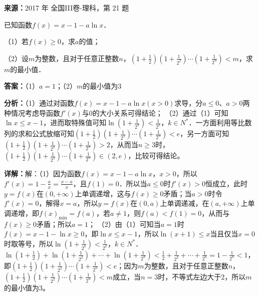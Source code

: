 \begin{question}[points=12]
\textbf{来源：}2017 年 全国III卷-理科，第 21 题\par
已知函数$f(x)=x-1-a\ln x$．

（1）若$f(x)\ge 0$，求$a$的值；

（2）设$m$为整数，且对于任意正整数$n$，$(1+\frac{1}{2})(1+\frac{1}{2^2})\cdots(1+\frac{1}{2^n})<m$，求$m$的最小值．
\begin{solution}
\textbf{答案：}（1）$a=1$；（2）$m$的最小值为$3$

\textbf{分析：}（1）通过对函数$f(x)=x-1-a\ln x(x>0)$求导，分$a\le 0$、$a>0$两种情况考虑导函数$f'(x)$与$0$的大小关系可得结论；
（2）通过（1）可知$\ln x\le x-1$，进而取特殊值可知$\ln(1+\frac{1}{2^k})<\frac{1}{2^k}$，$k\in N^*$．一方面利用等比数列的求和公式放缩可知$(1+\frac{1}{2})(1+\frac{1}{2^2})\cdots(1+\frac{1}{2^n})<e$，另一方面可知$(1+\frac{1}{2})(1+\frac{1}{2^2})\cdots(1+\frac{1}{2^n})>2$，从而当$n\ge 3$时，$(1+\frac{1}{2})(1+\frac{1}{2^2})\cdots(1+\frac{1}{2^n})\in(2,e)$，比较可得结论。

\textbf{详解：}解：（1）因为函数$f(x)=x-1-a\ln x$，$x>0$，所以$f'(x)=1-\frac{a}{x}=\frac{x-a}{x}$，且$f(1)=0$．所以当$a\le 0$时$f'(x)>0$恒成立，此时$y=f(x)$在$(0,+\infty)$上单调递增，这与$f(x)\ge 0$矛盾；当$a>0$时令$f'(x)=0$，解得$x=a$，所以$y=f(x)$在$(0,a)$上单调递减，在$(a,+\infty)$上单调递增，即$f(x)_{\min}=f(a)$，若$a\neq 1$，则$f(a)<f(1)=0$，从而与$f(x)\ge 0$矛盾；所以$a=1$；
（2）由（1）可知当$a=1$时$f(x)=x-1-\ln x\ge 0$，即$\ln x\le x-1$，所以$\ln(x+1)\le x$当且仅当$x=0$时取等号，所以$\ln(1+\frac{1}{2^k})<\frac{1}{2^k}$，$k\in N^*$．$\ln(1+\frac{1}{2})+\ln(1+\frac{1}{2^2})+\cdots+\ln(1+\frac{1}{2^n})<\frac{1}{2}+\frac{1}{2^2}+\cdots+\frac{1}{2^n}=1-\frac{1}{2^n}<1$，即$(1+\frac{1}{2})(1+\frac{1}{2^2})\cdots(1+\frac{1}{2^n})<e$；因为$m$为整数，且对于任意正整数$n$，$(1+\frac{1}{2})(1+\frac{1}{2^2})\cdots(1+\frac{1}{2^n})<m$成立，当$n=3$时，不等式左边大于$2$，所以$m$的最小值为$3$。
\end{solution}
\end{question}


